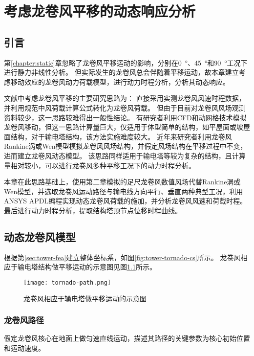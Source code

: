 \graphicspath{{figures/dynamic/}}

\chapter{考虑龙卷风平移的动态响应分析}

\section{引言}
第\ref{chapter:static}章忽略了龙卷风平移运动的影响，分别在\SI{0}{\degree}、\SI{45}{\degree}和\SI{90}{\degree}工况下进行静力非线性分析。
但实际发生的龙卷风总会伴随着平移运动，故本章建立考虑移动效应的龙卷风动力荷载模型，进行动力时程分析，分析其动态响应。

文献中考虑龙卷风平移的主要研究思路为：
直接采用实测龙卷风风速时程数据，并利用规范中风荷载计算公式转化为龙卷风荷载。
但由于目前对龙卷风风场观测资料较少，这一思路较难得出一般性结论。
有研究者利用CFD和动网格技术模拟龙卷风移动，但这一思路计算量巨大，仅适用于体型简单的结构，如平屋面或坡屋面结构，对于输电塔结构，该方法实施难度较大。
近年来研究者利用龙卷风Rankine涡或Wen模型模拟龙卷风风场结构，并假定风场结构在平移过程中不变，进而建立龙卷风动态模型。
该思路同样适用于输电塔等较为复杂的结构，且计算量相对较小，可以进行龙卷风多种平移工况下的动力时程分析。

本章在此思路基础上，使用第二章模拟的足尺龙卷风数值风场代替Rankine涡或Wen模型，并选取龙卷风运动路径与输电线方向平行、垂直两种典型工况，利用ANSYS APDL编程实现动态龙卷风荷载的施加，并分析龙卷风风速和荷载时程。
最后进行动力时程分析，提取结构塔顶节点位移时程曲线。

\section{动态龙卷风模型}

根据第\ref{sec:tower-fea}建立整体坐标系，如图\ref{fig:tower-tornado-cs}所示。
龙卷风相应于输电塔结构做平移运动的示意图见图\ref{fig:tornado-path}所示。
\begin{figure}[!htpb]
	\centering
	\texttt{[image: tornado-path.png]}
	\caption{龙卷风相应于输电塔做平移运动的示意图}
	\label{fig:tornado-path}
\end{figure}

\subsection{龙卷风路径}

假定龙卷风核心在地面上做匀速直线运动，描述其路径的关键参数为核心初始位置和运动速度。

